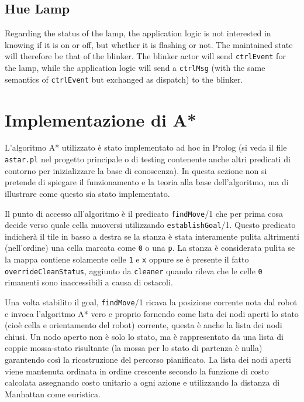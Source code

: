 \subsection{Hue Lamp}
Regarding the status of the lamp, the application logic is not interested in knowing if it is on or off, but whether it is flashing or not. The maintained state will therefore be that of the blinker. The blinker actor will send \texttt{ctrlEvent} for the lamp, while the application logic will send a \texttt{ctrlMsg} (with the same semantics of \texttt{ctrlEvent} but exchanged as dispatch) to the blinker.

\section{Implementazione di A*}\label{prt:astar_prolog}
L'algoritmo A* utilizzato è stato implementato ad hoc in Prolog (si veda il file \texttt{astar.pl} nel progetto principale o di testing contenente anche altri predicati di contorno per inizializzare la base di conoscenza). In questa sezione non si pretende di spiegare il funzionamento e la teoria alla base dell'algoritmo, ma di illustrare come questo sia stato implementato.

Il punto di accesso all'algoritmo è il predicato \texttt{findMove}/1 che per prima cosa decide verso quale cella muoversi utilizzando \texttt{establishGoal}/1. Questo predicato indicherà il tile in basso a destra se la stanza è stata interamente pulita altrimenti (nell'ordine) una cella marcata come \texttt{0} o una \texttt{p}.
La stanza è considerata pulita se la mappa contiene solamente celle \texttt{1} e \texttt{x} oppure se è presente il fatto \texttt{overrideCleanStatus}, aggiunto da \texttt{cleaner} quando rileva che le celle \texttt{0} rimanenti sono inaccessibili a causa di ostacoli.

Una volta stabilito il goal, \texttt{findMove}/1 ricava la posizione corrente nota dal robot e invoca l'algoritmo A* vero e proprio fornendo come lista dei nodi aperti lo stato (cioè cella e orientamento del robot) corrente, questa è anche la lista dei nodi chiusi. Un nodo aperto non è solo lo stato, ma è rappresentato da una lista di coppie mossa-stato risultante (la mossa per lo stato di partenza è nulla) garantendo così la ricostruzione del percorso pianificato. La lista dei nodi aperti viene mantenuta ordinata in ordine crescente secondo la funzione di costo calcolata assegnando costo unitario a ogni azione e utilizzando la distanza di Manhattan come euristica.

